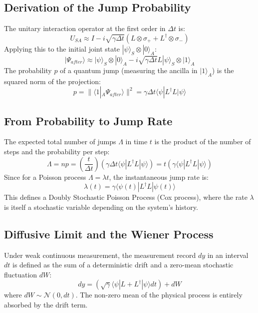 \documentclass[a4paper,12pt]{article}
\begin{document}
\subsection{Derivation of the Jump Probability}
The unitary interaction operator at the first order in $\Delta t$ is:
\begin{equation}
	U_{SA} \approx I - i \sqrt{\gamma \Delta t} \left( L \otimes \sigma_+ + L^\dagger \otimes \sigma_- \right)
\end{equation}
Applying this to the initial joint state $|\psi\rangle_S \otimes |0\rangle_A$:
\begin{equation}
	|\Psi_{after}\rangle \approx |\psi\rangle_S \otimes |0\rangle_A - i \sqrt{\gamma \Delta t} L |\psi\rangle_S \otimes |1\rangle_A
\end{equation}
The probability $p$ of a quantum jump (measuring the ancilla in $|1\rangle_A$) is the squared norm of the projection:
\begin{equation}
	p = \Big\| \langle 1|_A \Psi_{after}\rangle \Big\|^2 = \gamma \Delta t \langle \psi | L^\dagger L | \psi \rangle
\end{equation}

\subsection{From Probability to Jump Rate}
The expected total number of jumps $\Lambda$ in time $t$ is the product of the number of steps and the probability per step:
\begin{equation}
	\Lambda = n p = \left(\frac{t}{\Delta t}\right) \left(\gamma \Delta t \langle \psi | L^\dagger L | \psi \rangle\right) = t \left(\gamma \langle \psi | L^\dagger L | \psi \rangle\right)
\end{equation}
Since for a Poisson process $\Lambda = \lambda t$, the instantaneous jump rate is:
\begin{equation}
	\lambda(t) = \gamma \langle \psi(t) | L^\dagger L | \psi(t) \rangle
\end{equation}
This defines a Doubly Stochastic Poisson Process (Cox process), where the rate $\lambda$ is itself a stochastic variable depending on the system's history.

\subsection{Diffusive Limit and the Wiener Process}
Under weak continuous measurement, the measurement record $dy$ in an interval $dt$ is defined as the sum of a deterministic drift and a zero-mean stochastic fluctuation $dW$:
\begin{equation}
	dy = \left( \sqrt{\gamma} \langle \psi | L + L^\dagger | \psi \rangle dt \right) + dW
\end{equation}
where $dW \sim \mathcal{N}(0, dt)$. The non-zero mean of the physical process is entirely absorbed by the drift term.
\end{document}
